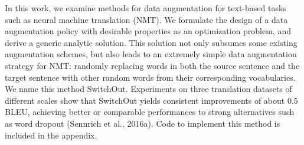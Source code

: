 In this work, we examine methods for data augmentation for text-based tasks such as neural machine translation (NMT). We formulate the design of a data augmentation policy with desirable properties as an optimization problem, and derive a generic analytic solution. This solution not only subsumes some existing augmentation schemes, but also leads to an extremely simple data augmentation strategy for NMT: randomly replacing words in both the source sentence and the target sentence with other random words from their corresponding vocabularies. We name this method SwitchOut. Experiments on three translation datasets of different scales show that SwitchOut yields consistent improvements of about 0.5 BLEU, achieving better or comparable performances to strong alternatives such as word dropout (Sennrich et al., 2016a). Code to implement this method is included in the appendix.
